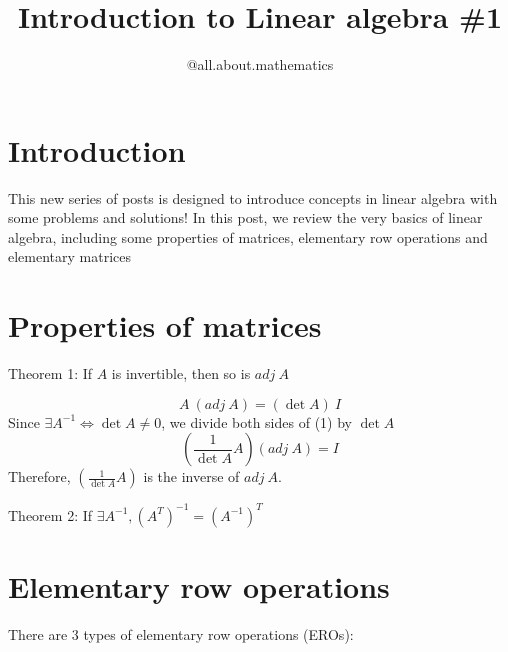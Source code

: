 \documentclass[12pt]{article}
\title{Introduction to Linear algebra \#1}
\author{@all.about.mathematics}
\begin{document}
\maketitle
\large
\section{Introduction}
This new series of posts is designed to introduce concepts in linear algebra with some problems and solutions! 
\newline In this post, we review the very basics of linear algebra, including some \textcolor{myyellow}{properties of matrices, elementary row operations and elementary matrices}

\newpage
\section{Properties of matrices}
\textcolor{myyellow}{Theorem 1: If $A$ is invertible, then so is $adj \:A$ }
\medskip

\begin{equation}
A \:(adj\:A)= (\det A)\: I
\end{equation}
Since $\exists A^{-1}\iff \det A \neq 0$, we divide both sides of (1) by $\det A$
$$\left(\frac{1}{\det A}A\right)(adj \: A)=I$$
Therefore, $\left(\frac{1}{\det A}A\right)$ is the inverse of $adj \: A$.
\medskip

\noindent \textcolor{myyellow}{Theorem 2: If $\exists A^{-1}, ({A^T})^{-1}=({A^{-1}})^T$}
\medskip


\newpage
\section{Elementary row operations}
There are 3 types of elementary row operations (EROs):
\medskip

\noindent{\textcolor{myred}{Type I: Swapping row $i$ and row $j$}}


\medskip
\end{document}
